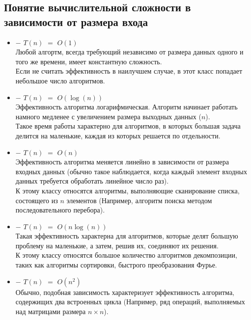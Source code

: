     \subsection{Понятие вычислительной сложности в зависимости от размера входа}
    \begin{itemize}
        \item {} $-$ $T(n)$ $=$ $O(1)$\\
            Любой алгортм, всегда требующий независимо от размера данных одного и того же времени, имеет константную сложность.\\
            Если не считать эффективность в наилучшем случае, в этот класс попадает небольшое число алгоритмов.
        \item {} $-$ $T(n)$ $=$ $O(\log(n))$\\
            Эффективность алгоритма логарифмическая. Алгоритм начинает работать намного медленее с увеличением размера выходных данных ($n$).\\
            Такое время работы характерно для алгоритмов, в которых большая задача делится на маленькие, каждая из которых решается по отдельности. 
        \item {} $-$ $T(n)$ $=$ $O(n)$\\
            Эффективность алгоритма меняется линейно в зависимости от размера входных данных (обычно такое наблюдается, когда каждый элемент входных данных требуется обработать линейное число раз).\\
            К этому классу относятся алгоритмы, выполняющие сканирование списка, состоящего из $n$ элементов (Например, алгоритм поиска методом последовательного перебора).
        \item {} $-$ $T(n)$ $=$ $O(n\log(n))$\\
            Такая эффективность характерна для алгоритмов, которые делят большую проблему на маленькие, а затем, решив их, соединяют их решения.\\
            К этому классу относятся большое количество алгоритмов декомпозиции, таких как алгоритмы сортировки, быстрого преобразования Фурье.

        \item {} $-$ $T(n)$ $=$ $O(n^2)$\\
            Обычно, подобная зависимость характеризует эффективность алгоритма, содержищих два встроенных цикла (Например, ряд операций, выполняемых над матрицами размера $n \times n$).
            

\end{itemize}
